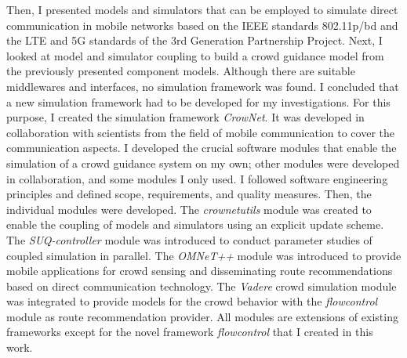 Then, I presented models and simulators that can be employed to simulate direct communication in mobile networks based on the IEEE standards 802.11p/bd and the LTE and 5G standards of the 3rd Generation Partnership Project. Next, I looked at model and simulator coupling to build a crowd guidance model from the previously presented component models. Although there are suitable middlewares and interfaces, no simulation framework was found. I concluded that a new simulation framework had to be developed for my investigations.
%
For this purpose, I created the simulation framework \textit{CrowNet}. It was developed in collaboration with scientists from the field of mobile communication to cover the communication aspects. I developed the crucial software modules that enable the simulation of a crowd guidance system on my own; other modules were developed in collaboration, and some modules I only used. I followed software engineering principles and defined scope, requirements, and quality measures. Then, the individual modules were developed. The \textit{crownetutils} module was created to enable the coupling of models and simulators using an explicit update scheme. The \textit{SUQ-controller} module was introduced to conduct parameter studies of coupled simulation in parallel. The \mbox{\textit{OMNeT++}} module was introduced to provide mobile applications for crowd sensing and disseminating route recommendations based on direct communication technology. The \textit{Vadere} crowd simulation module was integrated to provide models for the crowd behavior with the \textit{flowcontrol} module as route recommendation provider. All modules are extensions of existing frameworks except for the novel framework \textit{flowcontrol} that I created in this work. 


